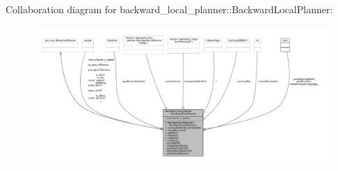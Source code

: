 Collaboration diagram for backward\+\_\+local\+\_\+planner\+:\+:Backward\+Local\+Planner\+:
\nopagebreak
\begin{figure}[H]
\begin{center}
\leavevmode
\includegraphics[width=350pt]{classbackward__local__planner_1_1BackwardLocalPlanner__coll__graph}
\end{center}
\end{figure}
